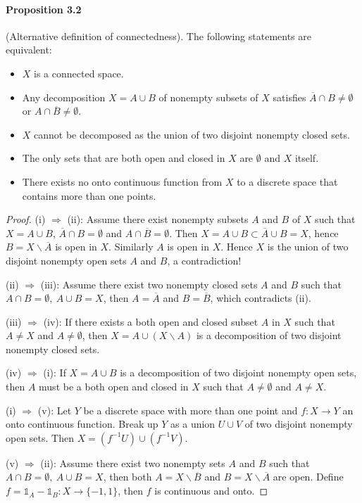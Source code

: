 \documentclass{article}
\numberwithin{equation}{section}
\theoremstyle{plain}
\theoremstyle{definition}
\begin{document}
\paragraph{Proposition 3.2\label{prop:3.2}} (Alternative definition of connectedness). The following statements are equivalent:
\begin{itemize}
	\item[(i)] $X$ is a connected space.
	\item[(ii)] Any decomposition $X=A\cup B$ of nonempty subsets of $X$ satisfies $\overline{A}\cap B\neq\emptyset$ or $A\cap\overline{B}\neq\emptyset$. 
	\item[(iii)] $X$ cannot be decomposed as the union of two disjoint nonempty closed sets.
	\item[(iv)] The only sets that are both open and closed in $X$ are $\emptyset$ and $X$ itself.
	\item [(v)] There exists no onto continuous function from $X$ to a discrete space that contains more than one points.
\end{itemize}
\begin{proof}
(i) $\Rightarrow$ (ii): Assume there exist nonempty subsets $A$ and $B$ of $X$ such that $X=A\cup B$, $\overline{A}\cap B = \emptyset$ and $A\cap\overline{B}=\emptyset$. Then $X=A\cup B\subset \overline{A}\cup B = X$, hence $B=X\backslash\overline{A}$ is open in $X$. Similarly $A$ is open in $X$. Hence $X$ is the union of two disjoint nonempty open sets $A$ and $B$, a contradiction!

(ii) $\Rightarrow$ (iii): Assume there exist two nonempty closed sets $A$ and $B$ such that $A\cap B = \emptyset,\ A\cup B=X$, then $A=\overline{A}$ and $B=\overline{B}$, which contradicts (ii).


(iii) $\Rightarrow$ (iv):  If there exists a both open and closed subset $A$ in $X$ such that $A\neq X$ and $A\neq\emptyset$, then $X=A\cup(X\backslash A)$ is a decomposition of two disjoint nonempty closed sets.

(iv) $\Rightarrow$ (i): If $X=A\cup B$ is a decomposition of two disjoint nonempty open sets, then $A$ must be a both open and closed in $X$ such that $A\neq\emptyset$ and $A\neq X$.

(i) $\Rightarrow$ (v): Let $Y$ be a discrete space with more than one 
point and $f:X\to Y$ an onto continuous function. Break up $Y$ as a union $U\cup V$ of two disjoint nonempty open sets. Then $X=(f^{-1}U)\cup (f^{-1}V)$.

(v) $\Rightarrow$ (ii): Assume there exist two nonempty sets $A$ and $B$ such that $A\cap B = \emptyset,\ A\cup B=X$, then both $A=X\backslash\overline{B}$ and $B=X\backslash\overline{A}$ are open. Define $f = \mathds{1}_A - \mathds{1}_B:X\to\{-1,1\}$, then $f$ is continuous and onto.
\end{proof}
\end{document}
